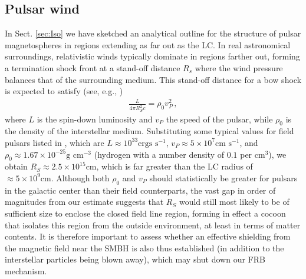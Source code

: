 \documentclass{aa}
\newcommand{\bea}{\begin{eqnarray}}
\newcommand{\eea}{\end{eqnarray}}
\begin{document}
\subsection{Pulsar wind}
In Sect. \ref{sec:Iso} we have sketched an analytical outline for the structure of pulsar magnetospheres in regions extending as far out as the LC. In real astronomical surroundings, relativistic winds typically dominate in regions farther out, forming a termination shock front at a stand-off distance $R_s$ 
where the wind pressure balances that of the surrounding medium. This stand-off distance for a bow shock is expected to satisfy (see, e.g., \cite{2006ARA&A..44...17G})
\bea \label{eq:Standoff}
\frac{L}{4\pi R_S^2 c} =\rho_0 v_P^2\,,
\eea
where $L$ is the spin-down luminosity and $v_P$ the speed of the pulsar, while $\rho_0$ is the density of the interstellar medium. Substituting some typical values for field pulsars listed in \cite{2006ARA&A..44...17G}, which are $L \approx 10^{33} \text{ergs s}^{-1}$, $v_P\approx 5\times 10^7 \text{cm s}^{-1}$, and $\rho_0 \approx 1.67\times 10^{-25} \text{g cm}^{-3}$ (hydrogen with a number density of $0.1$ per $\text{cm}^{3}$), we obtain $R_S \approx 2.5\times 10^{15}\text{cm}$, which is far greater than the LC radius of $\approx 5\times 10^9 \text{cm}$. Although both $\rho_0$ and $v_P$ should statistically be greater for pulsars in the galactic center than their field counterparts, the vast gap in order of magnitudes from our estimate suggests that $R_S$ would still most likely to be of sufficient size to enclose the closed field line region, forming in effect a cocoon that isolates this region from the outside environment, at least in terms of matter contents. It is therefore important to assess whether an effective shielding from the magnetic field near the SMBH is also thus established (in addition to the interstellar particles being blown away), which may shut down our FRB mechanism.
\end{document}
